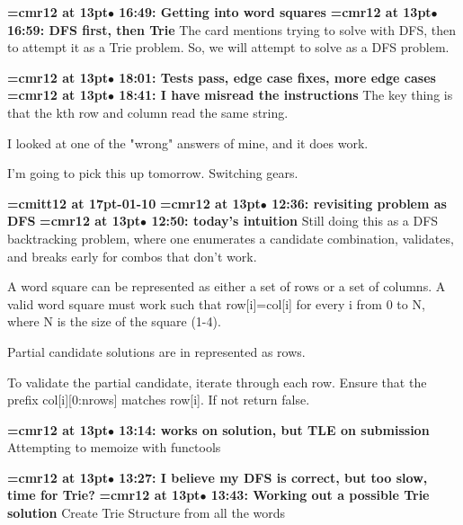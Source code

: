 {\smallskip\noindent\bf\font\titlefont=cmr12 at 13pt\titlefont $\bullet$ 16:49: Getting into word squares}\smallskip
{\smallskip\noindent\bf\font\titlefont=cmr12 at 13pt\titlefont $\bullet$ 16:59: DFS first, then Trie}\smallskip
The card mentions trying to solve with DFS, then to attempt it as a Trie problem. So, we will attempt to solve as a DFS problem.
\par

{\smallskip\noindent\bf\font\titlefont=cmr12 at 13pt\titlefont $\bullet$ 18:01: Tests pass, edge case fixes, more edge cases}\smallskip
{\smallskip\noindent\bf\font\titlefont=cmr12 at 13pt\titlefont $\bullet$ 18:41: I have misread the instructions}\smallskip
The key thing is that the kth row and column read the same string.
\par

I looked at one of the "wrong" answers of mine, and it does work.
\par

I'm going to pick this up tomorrow. Switching gears.
\par

{\medskip\noindent\bf\font\titlefont=cmitt12 at 17pt-01-10}\medskip
{\smallskip\noindent\bf\font\titlefont=cmr12 at 13pt\titlefont $\bullet$ 12:36: revisiting problem as DFS}\smallskip
{\smallskip\noindent\bf\font\titlefont=cmr12 at 13pt\titlefont $\bullet$ 12:50: today's intuition}\smallskip
Still doing this as a DFS backtracking problem, where one enumerates a candidate combination, validates, and breaks early for combos that don't work.
\par

A word square can be represented as either a set of rows or a set of columns. A valid word square must work such that row[i]=col[i] for every i from 0 to N, where N is the size of the square (1-4).
\par

Partial candidate solutions are in represented as rows.
\par

To validate the partial candidate, iterate through each row. Ensure that the prefix col[i][0:nrows] matches row[i]. If not return false.
\par

{\smallskip\noindent\bf\font\titlefont=cmr12 at 13pt\titlefont $\bullet$ 13:14: works on solution, but TLE on submission}\smallskip
Attempting to memoize with functools
\par

{\smallskip\noindent\bf\font\titlefont=cmr12 at 13pt\titlefont $\bullet$ 13:27: I believe my DFS is correct, but too slow, time for Trie?}\smallskip
{\smallskip\noindent\bf\font\titlefont=cmr12 at 13pt\titlefont $\bullet$ 13:43: Working out a possible Trie solution}\smallskip
Create Trie Structure from all the words
\par

